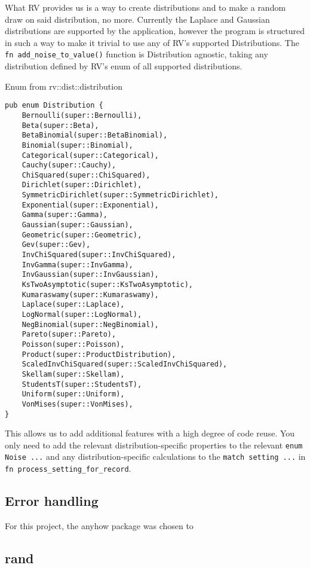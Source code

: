 What RV provides us is a way to create distributions and to make a random draw on said distribution, no more. Currently the Laplace and Gaussian distributions are supported by the application, however the program is structured in such a way to make it trivial to use any of RV's supported Distributions. The \texttt{fn add_noise_to_value()} function is Distribution agnostic, taking any distribution defined by RV's enum of all supported distributions.
\begin{listing}[!ht]
\caption{Enum from rv::dist::distribution}
\label{code:rv}
\begin{verbatim}
pub enum Distribution {
    Bernoulli(super::Bernoulli),
    Beta(super::Beta),
    BetaBinomial(super::BetaBinomial),
    Binomial(super::Binomial),
    Categorical(super::Categorical),
    Cauchy(super::Cauchy),
    ChiSquared(super::ChiSquared),
    Dirichlet(super::Dirichlet),
    SymmetricDirichlet(super::SymmetricDirichlet),
    Exponential(super::Exponential),
    Gamma(super::Gamma),
    Gaussian(super::Gaussian),
    Geometric(super::Geometric),
    Gev(super::Gev),
    InvChiSquared(super::InvChiSquared),
    InvGamma(super::InvGamma),
    InvGaussian(super::InvGaussian),
    KsTwoAsymptotic(super::KsTwoAsymptotic),
    Kumaraswamy(super::Kumaraswamy),
    Laplace(super::Laplace),
    LogNormal(super::LogNormal),
    NegBinomial(super::NegBinomial),
    Pareto(super::Pareto),
    Poisson(super::Poisson),
    Product(super::ProductDistribution),
    ScaledInvChiSquared(super::ScaledInvChiSquared),
    Skellam(super::Skellam),
    StudentsT(super::StudentsT),
    Uniform(super::Uniform),
    VonMises(super::VonMises),
}
\end{verbatim}
\end{listing}

This allows us to add additional features with a high degree of code reuse. You only need to add the relevant distribution-specific properties to the relevant \texttt{enum Noise {...}} and any distribution-specific calculations to the \texttt{match setting {...}} in \texttt{fn process_setting_for_record}. 

\subsection{Error handling}
For this project, the anyhow package was chosen to 

\subsection{rand}
